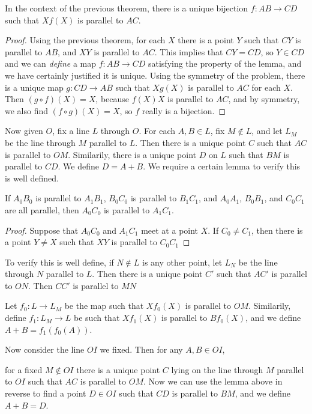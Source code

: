 \begin{corollary}
    In the context of the previous theorem, there is a unique bijection $f: AB \to CD$ such that $Xf(X)$ is parallel to $AC$.
\end{corollary}
\begin{proof}
    Using the previous theorem, for each $X$ there is a point $Y$ such that $CY$ is parallel to $AB$, and $XY$ is parallel to $AC$. This implies that $CY = CD$, so $Y \in CD$ and we can {\it define} a map $f: AB \to CD$ satisfying the property of the lemma, and we have certainly justified it is unique. Using the symmetry of the problem, there is a unique map $g: CD \to AB$ such that $Xg(X)$ is parallel to $AC$ for each $X$. Then $(g \circ f)(X) = X$, because $f(X)X$ is parallel to $AC$, and by symmetry, we also find $(f \circ g)(X) = X$, so $f$ really is a bijection.
\end{proof}

Now given $O$, fix a line $L$ through $O$. For each $A,B \in L$, fix $M \not \in L$, and let $L_M$ be the line through $M$ parallel to $L$. Then there is a unique point $C$ such that $AC$ is parallel to $OM$. Similarily, there is a unique point $D$ on $L$ such that $BM$ is parallel to $CD$. We define $D = A + B$. We require a certain lemma to verify this is well defined.

\begin{lemma}
    If $A_0B_0$ is parallel to $A_1B_1$, $B_0C_0$ is parallel to $B_1C_1$, and $A_0A_1$, $B_0B_1$, and $C_0C_1$ are all parallel, then $A_0C_0$ is parallel to $A_1C_1$.
\end{lemma}
\begin{proof}
    Suppose that $A_0C_0$ and $A_1C_1$ meet at a point $X$. If $C_0 \neq C_1$, then there is a point $Y \neq X$ such that $XY$ is parallel to $C_0C_1$
\end{proof}

To verify this is well define, if $N \not \in L$ is any other point, let $L_N$ be the line through $N$ parallel to $L$. Then there is a unique point $C'$ such that $AC'$ is parallel to $ON$. Then $CC'$ is parallel to $MN$


Let $f_0: L \to L_M$ be the map such that $Xf_0(X)$ is parallel to $OM$. Similarily, define $f_1: L_M \to L$ be such that $Xf_1(X)$ is parallel to $Bf_0(X)$, and we define $A + B = f_1(f_0(A))$.

Now consider the line $OI$ we fixed. Then for any $A,B \in OI$,

for a fixed $M \not \in OI$ there is a unique point $C$ lying on the line through $M$ parallel to $OI$ such that $AC$ is parallel to $OM$. Now we can use the lemma above in reverse to find a point $D \in OI$ such that $CD$ is parallel to $BM$, and we define $A + B = D$.


